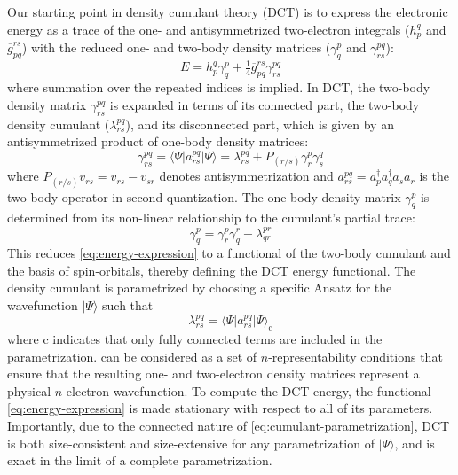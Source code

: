 Our starting point in density cumulant theory (DCT) is to express the electronic
energy as a trace of the one- and antisymmetrized two-electron integrals (\(
h_p^q \) and \(\overline{g}_{pq}^{rs}\)) with the reduced one- and two-body
density matrices (\(\gamma^p_q\) and \(\gamma^{pq}_{rs}\)):
\begin{equation}
    \label{eq:energy-expression}
    E
    =
    h_p^q
    \gamma^p_q
    +
    \tfrac{1}{4}
    \overline{g}_{pq}^{rs}
    \gamma^{pq}_{rs}
\end{equation}
where summation over the repeated indices is implied.
In DCT, the two-body density matrix \(\gamma^{pq}_{rs}\) is expanded in terms of
its connected part, the two-body density cumulant ($\lambda^{pq}_{rs}$), and its
disconnected part, which is given by an antisymmetrized product of one-body
density matrices:\cite{Kutzelnigg:2006p171101}
\begin{equation}
    \label{eq:two-body-n-rep}
    \gamma^{pq}_{rs}
    =
    \langle\Psi|
    a^{pq}_{rs}
    |\Psi\rangle
    =
    \lambda^{pq}_{rs}
    +
    P_{(r/s)}
    \gamma^p_r
    \gamma^q_s
\end{equation}
where \(P_{(r/s)}v_{rs} = v_{rs} - v_{sr}\) denotes antisymmetrization and
\mbox{$a^{pq}_{rs}=a^{\dag}_{p}a^{\dag}_{q}a^{}_{s}a^{}_{r}$} is the two-body operator in second quantization.
The one-body density matrix \(\gamma^p_q\) is determined from its non-linear
relationship to the cumulant's partial trace:\cite{Sokolov:2013p024107}
\begin{equation}
    \label{eq:one-body-n-rep}
    \gamma^p_q
    =
    \gamma^p_r
    \gamma^r_q
    -
    \lambda^{pr}_{qr}
\end{equation}
This reduces \cref{eq:energy-expression} to a functional of the two-body
cumulant and the basis of spin-orbitals, thereby defining the DCT energy
functional.
The density cumulant is parametrized by choosing a specific Ansatz for the
wavefunction \(|\Psi\rangle\) such that\cite{Sokolov:2014p074111}
\begin{equation}
    \label{eq:cumulant-parametrization}
    \lambda^{pq}_{rs}
    =
    \langle\Psi|
    a^{pq}_{rs}
    |\Psi\rangle_\mathrm{c}
\end{equation}
where $\mathrm{c}$ indicates that only fully connected terms are included in the
parametrization.
 can be considered as a set of
\(n\)-representability conditions that ensure that the resulting one- and
two-electron density matrices represent a physical \(n\)-electron wavefunction.
To compute the DCT energy, the functional \eqref{eq:energy-expression} is made
stationary with respect to all of its parameters.
Importantly, due to the connected nature of \cref{eq:cumulant-parametrization},
DCT is both size-consistent and size-extensive for any parametrization of
\(|\Psi\rangle\), and is exact in the limit of a complete
parametrization.\cite{Sokolov:2014p074111}

